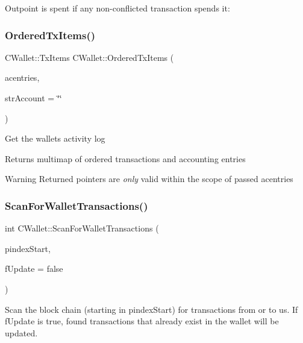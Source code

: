 Outpoint is spent if any non-\/conflicted transaction spends it\+: \mbox{\label{group__map_wallet_ga740572131004d77fbdb4617ec1aafb4a}} 
\subsubsection{\texorpdfstring{Ordered\+Tx\+Items()}{OrderedTxItems()}}
{\footnotesize\ttfamily C\+Wallet\+::\+Tx\+Items C\+Wallet\+::\+Ordered\+Tx\+Items (\begin{DoxyParamCaption}\item[{std\+::list$<$ \mbox{\hyperlink{class_c_accounting_entry}{C\+Accounting\+Entry}} $>$ \&}]{acentries,  }\item[{std\+::string}]{str\+Account = {\ttfamily \char`\"{}\char`\"{}} }\end{DoxyParamCaption})}

Get the wallet\textquotesingle{}s activity log \begin{DoxyReturn}{Returns}
multimap of ordered transactions and accounting entries 
\end{DoxyReturn}
\begin{DoxyWarning}{Warning}
Returned pointers are {\itshape only} valid within the scope of passed acentries 
\end{DoxyWarning}
\mbox{\label{group__map_wallet_ga979a17e80e4897ed1f4ae9a4be7c493c}} 
\subsubsection{\texorpdfstring{Scan\+For\+Wallet\+Transactions()}{ScanForWalletTransactions()}}
{\footnotesize\ttfamily int C\+Wallet\+::\+Scan\+For\+Wallet\+Transactions (\begin{DoxyParamCaption}\item[{\mbox{\hyperlink{class_c_block_index}{C\+Block\+Index}} $\ast$}]{pindex\+Start,  }\item[{bool}]{f\+Update = {\ttfamily false} }\end{DoxyParamCaption})}

Scan the block chain (starting in pindex\+Start) for transactions from or to us. If f\+Update is true, found transactions that already exist in the wallet will be updated. 